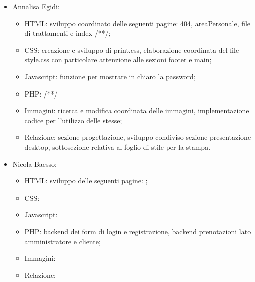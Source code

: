 \documentclass[]{article}
\begin{document}
\begin{itemize}
\begin{itemize}
	\end{itemize} 
	\item Annalisa Egidi:
	\begin{itemize}
		\item HTML: sviluppo coordinato delle seguenti pagine: 404, areaPersonale, file di trattamenti e index /**/;
		\item CSS: creazione e sviluppo di print.css, elaborazione coordinata del file style.css con particolare attenzione alle sezioni footer e main;
		\item Javascript: funzione per mostrare in chiaro la password;
		\item PHP: /**/
		\item Immagini: ricerca e modifica coordinata delle immagini, implementazione codice per l'utilizzo delle stesse;
		\item Relazione: sezione progettazione, sviluppo condiviso sezione presentazione desktop, sottosezione relativa al foglio di stile per la stampa. 
	\end{itemize} 
	\item Nicola Baesso:
	\begin{itemize}
		\item HTML: sviluppo delle seguenti pagine: ;
		\item CSS:
		\item Javascript:
		\item PHP: backend dei form di login e registrazione, backend prenotazioni lato amministratore e cliente;
		\item Immagini:
		\item Relazione:
	\end{itemize} 
\end{itemize}
\end{document}
